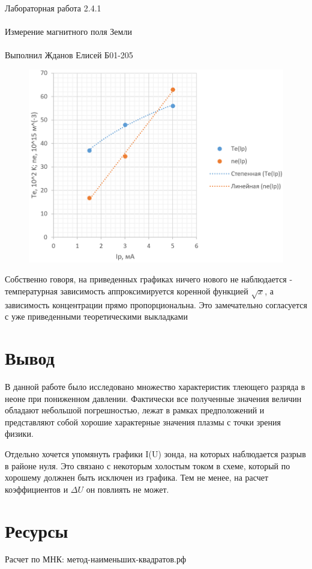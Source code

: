 \documentclass{astroedu-lab}
\begin{document}
\begin{problem}{\huge Лабораторная работа 2.4.1\\\\Измерение магнитного поля Земли\\\\Выполнил Жданов Елисей Б01-205}
\begin{figure}[!h]
	\centering
	\includegraphics[width=1\textwidth]{ple.png}
	\label{fig:boiler}
\end{figure}

Собственно говоря, на приведенных графиках ничего нового не наблюдается - температурная зависимость аппроксимируется коренной функцией $\sqrt{x}$, а зависимость концентрации прямо пропорциональна. Это замечательно согласуется с уже приведенными теоретическими выкладками

\section{Вывод}

В данной работе было исследовано множество характеристик тлеющего разряда в неоне при пониженном давлении. Фактически все полученные значения величин обладают небольшой погрешностью, лежат в рамках предположений и представляют собой хорошие характерные значения плазмы с точки зрения физики.

Отдельно хочется упомянуть графики I(U) зонда, на которых наблюдается разрыв в районе нуля. Это связано с некоторым холостым током в схеме, который по хорошему должнен быть исключен из графика. Тем не менее, на расчет коэффициентов и $\Delta U$ он повлиять не может.

\section{Ресурсы}

Расчет по МНК: метод-наименьших-квадратов.рф


\end{problem}
\end{document}
